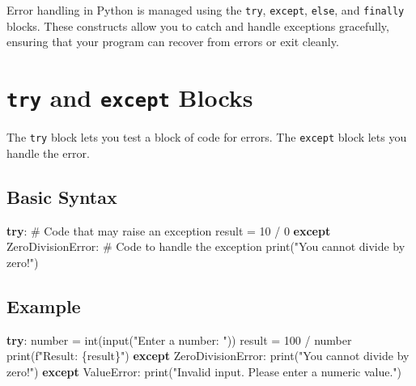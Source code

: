 \documentclass[
  letterpaper,
  DIV=11,
  numbers=noendperiod]{scrreprt}
\newenvironment{Shaded}{\begin{snugshade}}{\end{snugshade}}
\newcommand{\BuiltInTok}[1]{\textcolor[rgb]{0.00,0.23,0.31}{#1}}
\newcommand{\CommentTok}[1]{\textcolor[rgb]{0.37,0.37,0.37}{#1}}
\newcommand{\ControlFlowTok}[1]{\textcolor[rgb]{0.00,0.23,0.31}{\textbf{#1}}}
\newcommand{\DecValTok}[1]{\textcolor[rgb]{0.68,0.00,0.00}{#1}}
\newcommand{\NormalTok}[1]{\textcolor[rgb]{0.00,0.23,0.31}{#1}}
\newcommand{\OperatorTok}[1]{\textcolor[rgb]{0.37,0.37,0.37}{#1}}
\newcommand{\PreprocessorTok}[1]{\textcolor[rgb]{0.68,0.00,0.00}{#1}}
\newcommand{\SpecialCharTok}[1]{\textcolor[rgb]{0.37,0.37,0.37}{#1}}
\newcommand{\SpecialStringTok}[1]{\textcolor[rgb]{0.13,0.47,0.30}{#1}}
\newcommand{\StringTok}[1]{\textcolor[rgb]{0.13,0.47,0.30}{#1}}
\begin{document}
Error handling in Python is managed using the \texttt{try},
\texttt{except}, \texttt{else}, and \texttt{finally} blocks. These
constructs allow you to catch and handle exceptions gracefully, ensuring
that your program can recover from errors or exit cleanly.

\section{\texorpdfstring{\texttt{try} and \texttt{except}
Blocks}{try and except Blocks}}\label{try-and-except-blocks}

The \texttt{try} block lets you test a block of code for errors. The
\texttt{except} block lets you handle the error.

\subsection{Basic Syntax}\label{basic-syntax}

\begin{Shaded}
\begin{Highlighting}[]
\ControlFlowTok{try}\NormalTok{:}
    \CommentTok{\# Code that may raise an exception}
\NormalTok{    result }\OperatorTok{=} \DecValTok{10} \OperatorTok{/} \DecValTok{0}
\ControlFlowTok{except} \PreprocessorTok{ZeroDivisionError}\NormalTok{:}
    \CommentTok{\# Code to handle the exception}
    \BuiltInTok{print}\NormalTok{(}\StringTok{"You cannot divide by zero!"}\NormalTok{)}
\end{Highlighting}
\end{Shaded}

\subsection{Example}\label{example}

\begin{Shaded}
\begin{Highlighting}[]
\ControlFlowTok{try}\NormalTok{:}
\NormalTok{    number }\OperatorTok{=} \BuiltInTok{int}\NormalTok{(}\BuiltInTok{input}\NormalTok{(}\StringTok{"Enter a number: "}\NormalTok{))}
\NormalTok{    result }\OperatorTok{=} \DecValTok{100} \OperatorTok{/}\NormalTok{ number}
    \BuiltInTok{print}\NormalTok{(}\SpecialStringTok{f"Result: }\SpecialCharTok{\{}\NormalTok{result}\SpecialCharTok{\}}\SpecialStringTok{"}\NormalTok{)}
\ControlFlowTok{except} \PreprocessorTok{ZeroDivisionError}\NormalTok{:}
    \BuiltInTok{print}\NormalTok{(}\StringTok{"You cannot divide by zero!"}\NormalTok{)}
\ControlFlowTok{except} \PreprocessorTok{ValueError}\NormalTok{:}
    \BuiltInTok{print}\NormalTok{(}\StringTok{"Invalid input. Please enter a numeric value."}\NormalTok{)}
\end{Highlighting}
\end{Shaded}
\end{document}
